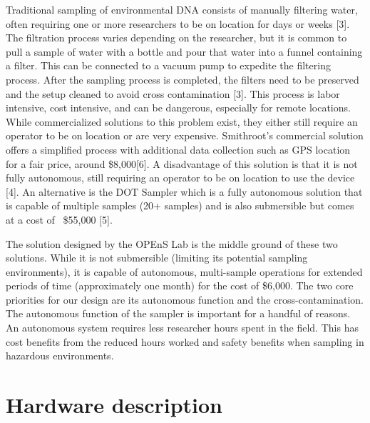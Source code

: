 \documentclass[11pt, letterpaper]{article}
\begin{document}
Traditional sampling of environmental DNA consists of manually filtering water, often requiring one or more researchers to be on location for days or weeks [3]. The filtration process varies depending on the researcher, but it is common to pull a sample of water with a bottle and pour that water into a funnel containing a filter. This can be connected to a vacuum pump to expedite the filtering process. After the sampling process is completed, the filters need to be preserved and the setup cleaned to avoid cross contamination [3]. This process is labor intensive, cost intensive, and can be dangerous, especially for remote locations. While commercialized solutions to this problem exist, they either still require an operator to be on location or are very expensive. Smithroot’s commercial solution offers a simplified process with additional data collection such as GPS location for a fair price, around \$8,000[6]. A disadvantage of this solution is that it is not fully autonomous, still requiring an operator to be on location to use the device [4]. An alternative is the DOT Sampler which is a fully autonomous solution that is capable of multiple samples (20+ samples) and is also submersible but comes at a cost of ~\$55,000 [5]. 

The solution designed by the OPEnS Lab is the middle ground of these two solutions. While it is not submersible (limiting its potential sampling environments), it is capable of autonomous, multi-sample operations for extended periods of time (approximately one month) for the cost of \$6,000. The two core priorities for our design are its autonomous function and the cross-contamination. The autonomous function of the  sampler is important for a handful of reasons. An autonomous system requires less researcher hours spent in the field. This has cost benefits from the reduced hours worked and safety benefits when sampling in hazardous environments.     



\section{Hardware description}
\end{document}
